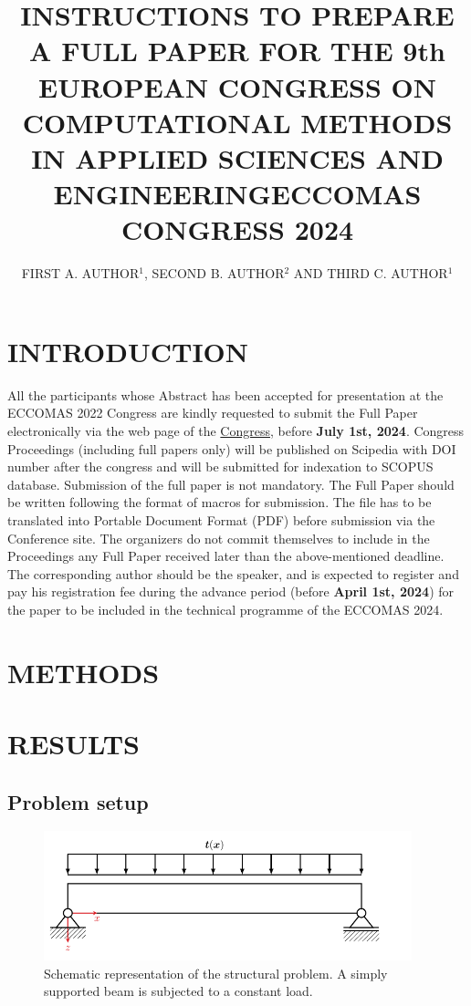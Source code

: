\documentclass[a4paper]{eccomas_paper-2024}
\title{INSTRUCTIONS TO PREPARE A FULL PAPER FOR THE 9th EUROPEAN CONGRESS ON COMPUTATIONAL METHODS IN APPLIED SCIENCES AND ENGINEERING\break ECCOMAS CONGRESS 2024}
\author{FIRST A. AUTHOR$^1$, SECOND B. AUTHOR$^2$ AND THIRD C. AUTHOR$^1$}
\begin{document}
\thispagestyle{empty}

\section{INTRODUCTION}

All the participants whose Abstract has been accepted for presentation at the ECCOMAS 2022 Congress are kindly requested to submit the Full Paper electronically via the web page of the \href{https://eccomas2024.org/lisbon}{Congress}, before \textbf{July 1st, 2024}. Congress Proceedings (including full papers only) will be published on Scipedia with DOI number after the congress and will be submitted for indexation to SCOPUS database. Submission of the full paper is not mandatory. The Full Paper should be written following the format of macros for submission. The file has to be translated into Portable Document Format (PDF) before submission via the Conference site. The organizers do not commit themselves to include in the Proceedings any Full Paper received later than the above-mentioned deadline. The corresponding author should be the speaker, and is expected to register and pay his registration fee during the advance period (before \textbf{April 1st, 2024}) for the paper to be included in the technical programme of the ECCOMAS 2024.

\section{METHODS}

\section{RESULTS}

\subsection{Problem setup}

\begin{figure}
    \begin{center}
        \includegraphics[width=0.95\textwidth]{../figures/beam/beam_sketch.pdf}
    \end{center}
    \caption{Schematic representation of the structural problem. A simply supported beam is subjected to a constant load.}\label{fig:beam_sketch}
\end{figure}
\end{document}
